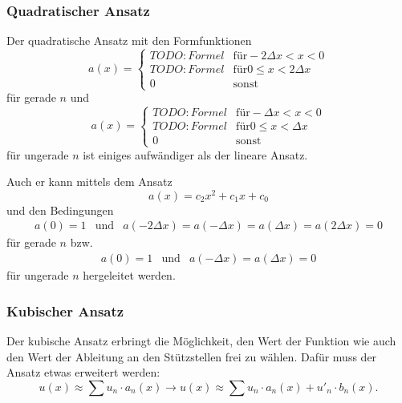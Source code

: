 \subsubsection{Quadratischer Ansatz}
Der quadratische Ansatz mit den Formfunktionen
\begin{equation}
    a(x) = \left\{ \begin{array}{ll}
        TODO: Formel & \mbox{für} -2 \Delta x < x < 0 \\
        TODO: Formel & \mbox{für} 0 \leq x < 2 \Delta x \\
        0            & \mbox{sonst}
    \end{array} \right.
\end{equation}
für gerade $n$ und
\begin{equation}
    a(x) = \left\{ \begin{array}{ll}
        TODO: Formel & \mbox{für} -\Delta x < x < 0 \\
        TODO: Formel & \mbox{für} 0 \leq x < \Delta x \\
        0            & \mbox{sonst}
    \end{array} \right.
\end{equation}
für ungerade $n$ ist einiges aufwändiger als der lineare Ansatz.

Auch er kann mittels dem Ansatz 
\begin{equation}
    a(x) = c_2x^2 + c_1x + c_0
\end{equation}
und den Bedingungen 
\begin{equation}
    \begin{array}{ccc}
        a(0) = 1 & \mbox{und} & a(-2 \Delta x) = a(-\Delta x) = a(\Delta x) = a(2 \Delta x) = 0
    \end{array}
\end{equation}
für gerade $n$ bzw.
\begin{equation}
    \begin{array}{ccc}
        a(0) = 1 & \mbox{und} & a(-\Delta x) = a(\Delta x) = 0
    \end{array}
\end{equation}
für ungerade $n$ hergeleitet werden.

\subsubsection{Kubischer Ansatz}
Der kubische Ansatz erbringt die Möglichkeit, den Wert der Funktion wie auch den Wert der Ableitung an den Stützstellen frei zu wählen.
Dafür muss der Ansatz etwas erweitert werden:
\begin{equation}
    u(x) \approx \sum{u_n \cdot a_n(x)} \rightarrow u(x) \approx \sum{u_n \cdot a_n(x) + u'_n \cdot b_n(x)}.
\end{equation}

